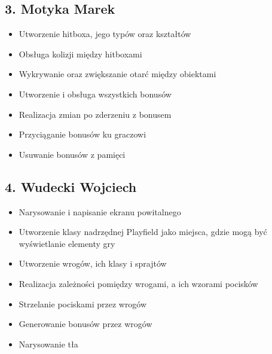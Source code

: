 \documentclass[a4paper,twoside]{article}
\begin{document}
		\subsection*{3. Motyka Marek}
			\begin{itemize}
				\item Utworzenie hitboxa, jego typów oraz kształtów
				\item Obsługa kolizji między hitboxami
				\item Wykrywanie oraz zwiększanie otarć między obiektami
				\item Utworzenie i obsługa wszystkich bonusów
				\item Realizacja zmian po zderzeniu z bonusem
				\item Przyciąganie bonusów ku graczowi
				\item Usuwanie bonusów z pamięci
			\end{itemize}
			
		\subsection*{4. Wudecki Wojciech}
			\begin{itemize}
				\item Narysowanie i napisanie ekranu powitalnego
				\item Utworzenie klasy nadrzędnej Playfield jako miejsca, gdzie mogą być wyświetlanie elementy gry
				\item Utworzenie wrogów, ich klasy i sprajtów
				\item Realizacja zależności pomiędzy wrogami, a ich wzorami pocisków
				\item Strzelanie pociskami przez wrogów
				\item Generowanie bonusów przez wrogów
				\item Narysowanie tła
			\end{itemize}
	
	
	
	
	
	
	
	
	
	
	
	
	
	
	
	
	
	
	
	
\end{document}
